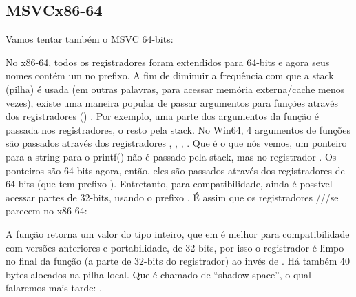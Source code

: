 \subsection{MSVC\EMDASH{}x86-64}

Vamos tentar também o MSVC 64-bits:




No x86-64, todos os registradores foram extendidos para 64-bits e agora seus nomes contém um  no prefixo.
A fim de diminuir a frequência com que a stack (pilha) é usada (em outras palavras, para acessar memória externa/cache menos vezes),
existe uma maneira popular de passar argumentos para funções através dos registradores () .
Por exemplo, uma parte dos argumentos da função é passada nos registradores, o resto pela stack.
No Win64, 4 argumentos de funções são passados através dos registradores \RCX, \RDX, , .
Que é o que nós vemos, um ponteiro para a string para o printf() não é passado pela stack, mas no registrador \RCX.
Os ponteiros são 64-bits agora, então, eles são passados através dos registradores de 64-bits (que tem prefixo ).
Entretanto, para compatibilidade, ainda é possível acessar partes de 32-bits, usando o prefixo .
É assim que os registradores \RAX/\EAX/\AX/\AL se parecem no x86-64:


A função \main retorna um valor do tipo inteiro, que em \CCpp é melhor para compatibilidade com versões anteriores e portabilidade,
de 32-bits, por isso o registrador \EAX é limpo no final da função (a parte de 32-bits do registrador) ao invés de \RAX.
Há também 40 bytes alocados na pilha local.
Que é chamado de ``shadow space'', o qual falaremos mais tarde: .

